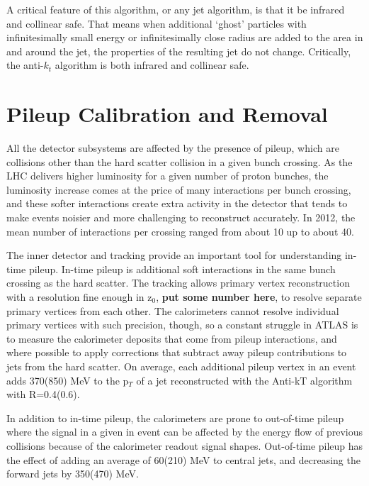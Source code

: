 A critical feature of this algorithm, or any jet algorithm, is that it be infrared and collinear safe.  That means when additional `ghost' particles with infinitesimally small energy or infinitesimally close radius are added to the area in and around the jet, the properties of the resulting jet do not change.  Critically, the anti-$k_t$ algorithm is both infrared and collinear safe.






\section{Pileup Calibration and Removal}
All the detector subsystems are affected by the presence of pileup, which are collisions other than the hard scatter collision in a given bunch crossing.  As the LHC delivers higher luminosity for a given number of proton bunches, the luminosity increase comes at the price of many interactions per bunch crossing, and these softer interactions create extra activity in the detector that tends to make events noisier and more challenging to reconstruct accurately.  In 2012, the mean number of interactions per crossing ranged from about 10 up to about 40.  

The inner detector and tracking provide an important tool for understanding in-time pileup.  In-time pileup is additional soft interactions in the same bunch crossing as the hard scatter.  The tracking allows primary vertex reconstruction with a resolution fine enough in z$_0$, \textbf{put some number here}, to resolve separate primary vertices from each other.   The calorimeters cannot resolve individual primary vertices with such precision, though, so a constant struggle in ATLAS is to measure the calorimeter deposits that come from pileup interactions, and where possible to apply corrections that subtract away pileup contributions to jets from the hard scatter.  On average, each additional pileup vertex in an event adds 370(850) MeV to the p$_T$ of a jet reconstructed with the Anti-kT algorithm with R=0.4(0.6).

In addition to in-time pileup, the calorimeters are prone to out-of-time pileup where the signal in a given in event can be affected by the energy flow of previous collisions because of the calorimeter readout signal shapes.  Out-of-time pileup has the effect of adding an average of 60(210) MeV to central jets, and decreasing the forward jets by 350(470) MeV.  

